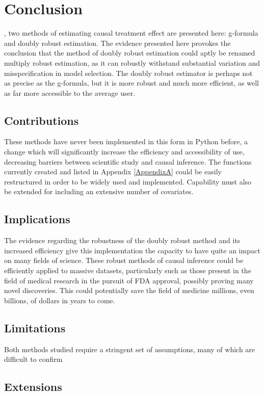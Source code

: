 \chapter{Conclusion}
\label{conclusion}


, two methods of estimating causal treatment effect are presented here: g-formula and doubly robust estimation.  The evidence presented here provokes the conclusion that the method of doubly robust estimation could aptly be renamed multiply robust estimation, as it can robustly withstand substantial variation and misspecification in model selection.  The doubly robust estimator is perhaps not as precise as the g-formula, but it is more robust and much more efficient, as well as far more accessible to the average user. 


\section{Contributions}
These methods have never been implemented in this form in Python before, a change which will significantly increase the efficiency and accessibility of use, decreasing barriers between scientific study and causal inference.  The functions currently created and listed in Appendix \ref{AppendixA} could be easily restructured in order to be widely used and implemented.  Capability must also be extended for including an extensive number of covariates.  


\section{Implications}
The evidence regarding the robustness of the doubly robust method and its increased efficiency give this implementation the capacity to have quite an impact on many fields of science.  These robust methods of causal inference could be efficiently applied to massive datasets, particularly such as those present in the field of medical research in the pursuit of FDA approval, possibly proving many novel discoveries.  This could potentially save the field of medicine millions, even billions, of dollars in years to come.   

\section{Limitations}
Both methods studied require a stringent set of assumptions, many of which are difficult to confirm

\section{Extensions} 